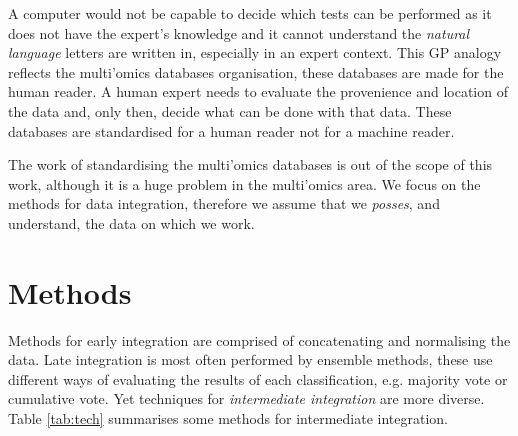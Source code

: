 \documentclass[11pt,a4paper,twoside,openright]{report}
\begin{document}
A computer would not be capable to decide which tests can be performed as it
does not have the expert's knowledge and it cannot understand the \emph{natural
language} letters are written in, especially in an expert context.  This GP
analogy reflects the multi'omics databases organisation, these databases are
made for the human reader.  A human expert needs to evaluate the provenience
and location of the data and, only then, decide what can be done with that
data.  These databases are standardised for a human reader not for a machine
reader.

The work of standardising the multi'omics databases is out of the scope of this
work, although it is a huge problem in the multi'omics area.  We focus on the
methods for data integration, therefore we assume that we \emph{posses}, and
understand, the data on which we work.

\section{Methods}

Methods for early integration are comprised of concatenating and normalising
the data.  Late integration is most often performed by ensemble methods, these
use different ways of evaluating the results of each classification, e.g.
majority vote or cumulative vote.  Yet techniques for \emph{intermediate
integration} are more diverse.  Table \ref{tab:tech} summarises some methods
for intermediate integration.
\end{document}
